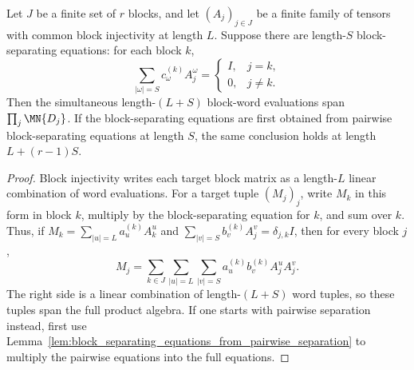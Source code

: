 \begin{lemma}
    \label{lem:product_word_span_from_bnt_block_separation}
    \leanok
    Let $J$ be a finite set of $r$ blocks, and let $(A_j)_{j\in J}$ be a
    finite family of tensors with common block injectivity at length $L$.
    Suppose there are length-$S$ block-separating equations: for each block
    $k$,
    \[
        \sum_{|\omega|=S} c_\omega^{(k)} A_j^\omega
        =
        \begin{cases}
            I, & j=k,\\
            0, & j\ne k.
        \end{cases}
    \]
    Then the simultaneous length-$(L+S)$ block-word evaluations span
    $\prod_j \MN{D_j}$. If the block-separating equations are first obtained
    from pairwise block-separating equations at length $S$, the same conclusion
    holds at length $L+(r-1)S$.
\end{lemma}

\begin{proof}
    \leanok
    Block injectivity writes each target block matrix as a length-$L$ linear
    combination of word evaluations. For a target tuple $(M_j)_j$, write $M_k$
    in this form in block $k$, multiply by the block-separating equation for
    $k$, and sum over $k$. Thus, if
    $M_k=\sum_{|u|=L}a_u^{(k)}A_k^u$ and
    $\sum_{|v|=S}b_v^{(k)}A_j^v=\delta_{j,k}I$, then for every block $j$,
    \[
        M_j=
        \sum_{k\in J}\sum_{|u|=L}\sum_{|v|=S}
        a_u^{(k)}b_v^{(k)} A_j^u A_j^v .
    \]
    The right side is a linear combination of length-$(L+S)$ word tuples, so
    these tuples span the full product algebra.
    If one starts with pairwise separation instead, first use
    Lemma~\ref{lem:block_separating_equations_from_pairwise_separation} to
    multiply the pairwise equations into the full equations.
\end{proof}
